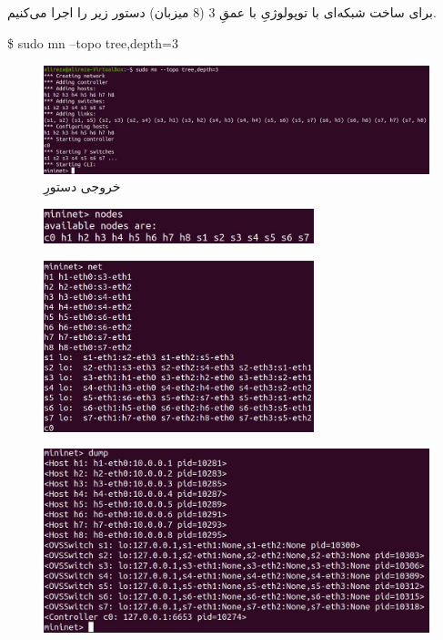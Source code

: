 \documentclass{article}
\begin{document}
\subsection{}
\subsubsection{}
برای ساخت شبکه‌ای با توپولوژیِ  با عمقِ 3 (8 میزبان) دستور زیر را اجرا می‌کنیم.
\begin{latin}
\$ sudo mn --topo tree,depth=3
\end{latin}
\begin{figure}[H]
    \centering
    \includegraphics[width=1.0\textwidth]{figures/3d.jpg}
    \caption
	{
خروجی دستورِ 
	}
    \label{fig:fig1}
\end{figure}
\begin{figure}[H]
    \centering
    \includegraphics[width=0.7\textwidth]{figures/3d1.jpg}
    \caption
	{
	}
    \label{fig:fig1}
\end{figure}
\begin{figure}[H]
    \centering
    \includegraphics[width=0.7\textwidth]{figures/3d2.jpg}
    \caption
	{
	}
    \label{fig:fig1}
\end{figure}
\begin{figure}[H]
    \centering
    \includegraphics[width=1.0\textwidth]{figures/3d3.jpg}
    \caption
	{
	}
    \label{fig:fig1}
\end{figure}
\end{document}
